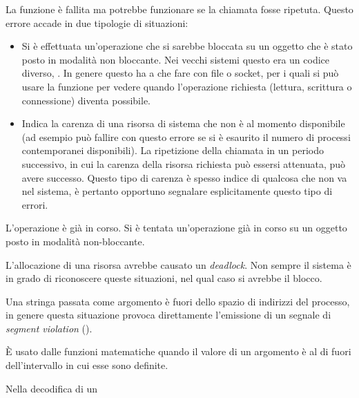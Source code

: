 \begin{basedescript}{\desclabelwidth{1.5cm}\desclabelstyle{\nextlinelabel}}
\item[\errcode{EAGAIN} \textit{Resource temporarily unavailable}.] La funzione è
  fallita ma potrebbe funzionare se la chiamata fosse ripetuta. Questo errore
  accade in due tipologie di situazioni:
  \begin{itemize}
  \item Si è effettuata un'operazione che si sarebbe bloccata su un oggetto
    che è stato posto in modalità non bloccante. Nei vecchi sistemi questo era
    un codice diverso, . In genere questo ha a che fare
    con file o socket, per i quali si può usare la funzione  per
    vedere quando l'operazione richiesta (lettura, scrittura o connessione)
    diventa possibile.
  \item Indica la carenza di una risorsa di sistema che non è al momento
    disponibile (ad esempio  può fallire con questo errore se si è
    esaurito il numero di processi contemporanei disponibili). La ripetizione
    della chiamata in un periodo successivo, in cui la carenza della risorsa
    richiesta può essersi attenuata, può avere successo. Questo tipo di
    carenza è spesso indice di qualcosa che non va nel sistema, è pertanto
    opportuno segnalare esplicitamente questo tipo di errori.
  \end{itemize}
\item[\errcode{EALREADY} \textit{Operation already in progress}.] L'operazione è
  già in corso. Si è tentata un'operazione già in corso su un oggetto posto in
  modalità non-bloccante.
\item[\errcode{EDEADLK} \textit{Deadlock avoided}.] L'allocazione di una
  risorsa avrebbe causato un \textit{deadlock}. Non sempre il sistema è in
  grado di riconoscere queste situazioni, nel qual caso si avrebbe il blocco.
\item[\errcode{EFAULT} \textit{Bad address}.] Una stringa passata come
  argomento è fuori dello spazio di indirizzi del processo, in genere questa
  situazione provoca direttamente l'emissione di un segnale di \textit{segment
    violation} ().
\item[\errcode{EDOM} \textit{Domain error}.] È usato dalle funzioni matematiche
  quando il valore di un argomento è al di fuori dell'intervallo in cui esse
  sono definite.
\item[\errcode{EILSEQ} \textit{Illegal byte sequence}.] Nella decodifica di un

\end{basedescript}
